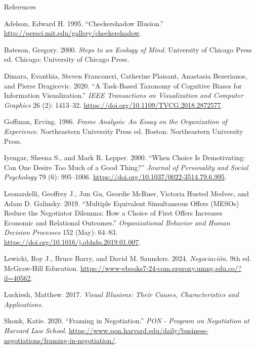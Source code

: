 \documentclass[
  ignorenonframetext,
]{beamer}
\newlength{\cslhangindent}
\newenvironment{CSLReferences}[2] %
 {\begin{list}{}{%
  \setlength{\itemindent}{0pt}
  \setlength{\leftmargin}{0pt}
  \setlength{\parsep}{0pt}
  \ifodd #1
   \setlength{\leftmargin}{\cslhangindent}
   \setlength{\itemindent}{-1\cslhangindent}
  \fi
  \setlength{\itemsep}{#2\baselineskip}}}
 {\end{list}}
\begin{document}
\begin{frame}[allowframebreaks]{References}
\label{refs}
\begin{CSLReferences}{1}{0}
Adelson, Edward H. 1995. {``Checkershadow {Illusion}.''}
\url{http://persci.mit.edu/gallery/checkershadow}.

Bateson, Gregory. 2000. \emph{Steps to an Ecology of Mind}. University
of Chicago Press ed. Chicago: University of Chicago Press.

Dimara, Evanthia, Steven Franconeri, Catherine Plaisant, Anastasia
Bezerianos, and Pierre Dragicevic. 2020. {``A {Task}-{Based} {Taxonomy}
of {Cognitive} {Biases} for {Information} {Visualization}.''} \emph{IEEE
Transactions on Visualization and Computer Graphics} 26 (2): 1413--32.
\url{https://doi.org/10.1109/TVCG.2018.2872577}.

Goffman, Erving. 1986. \emph{Frame Analysis: An Essay on the
Organization of Experience}. Northeastern University Press ed. Boston:
Northeastern University Press.

Iyengar, Sheena S., and Mark R. Lepper. 2000. {``When Choice Is
Demotivating: {Can} One Desire Too Much of a Good Thing?''}
\emph{Journal of Personality and Social Psychology} 79 (6): 995--1006.
\url{https://doi.org/10.1037/0022-3514.79.6.995}.

Leonardelli, Geoffrey J., Jun Gu, Geordie McRuer, Victoria Husted
Medvec, and Adam D. Galinsky. 2019. {``Multiple Equivalent Simultaneous
Offers ({MESOs}) Reduce the Negotiator Dilemma: {How} a Choice of First
Offers Increases Economic and Relational Outcomes.''}
\emph{Organizational Behavior and Human Decision Processes} 152 (May):
64--83. \url{https://doi.org/10.1016/j.obhdp.2019.01.007}.

Lewicki, Roy J., Bruce Barry, and David M. Saunders. 2024.
\emph{Negociación}. 9th ed. McGraw-Hill Education.
\url{https://www-ebooks7-24-com.ezproxy.umng.edu.co/?il=40562}.

Luckiesh, Matthew. 2017. \emph{Visual Illusions: Their Causes,
Characteristics and Applications}.

Shonk, Katie. 2020. {``Framing in {Negotiation}.''} \emph{PON - Program
on Negotiation at Harvard Law School}.
\url{https://www.pon.harvard.edu/daily/business-negotiations/framing-in-negotiation/}.


\end{CSLReferences}
\end{frame}
\end{document}
